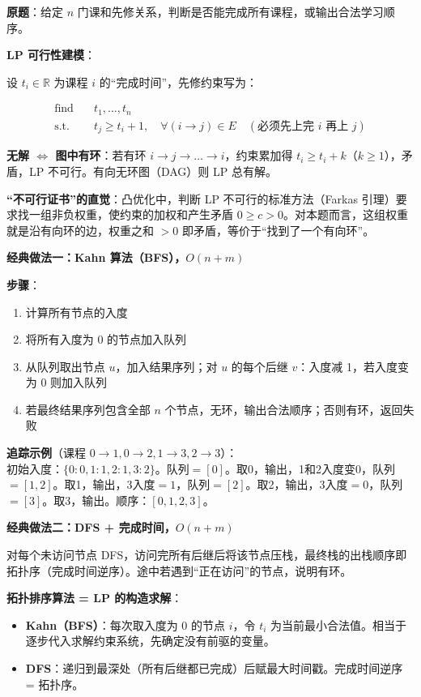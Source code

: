 \documentclass[12pt, a4paper]{ctexart}
\begin{document}
\begin{blackboard}

\textbf{原题}：给定 $n$ 门课和先修关系，判断是否能完成所有课程，或输出合法学习顺序。

\textbf{LP 可行性建模}：

设 $t_i \in \mathbb{R}$ 为课程 $i$ 的``完成时间''，先修约束写为：

\begin{align}
\text{find} \quad & t_1, \ldots, t_n \\
\text{s.t.} \quad & t_j \geq t_i + 1, \quad \forall (i \to j) \in E \quad (\text{必须先上完 }i\text{ 再上 }j)
\end{align}

\textbf{无解 $\Leftrightarrow$ 图中有环}：若有环 $i \to j \to \ldots \to i$，约束累加得 $t_i \geq t_i + k$（$k \geq 1$），矛盾，LP 不可行。有向无环图（DAG）则 LP 总有解。

\textbf{``不可行证书''的直觉}：凸优化中，判断 LP 不可行的标准方法（Farkas 引理）要求找一组非负权重，使约束的加权和产生矛盾 $0 \geq c > 0$。对本题而言，这组权重就是沿有向环的边，权重之和 $> 0$ 即矛盾，等价于``找到了一个有向环''。

\textbf{经典做法一：Kahn 算法（BFS），$O(n+m)$}

\textbf{步骤}：
\begin{enumerate}
    \item 计算所有节点的入度
    \item 将所有入度为 0 的节点加入队列
    \item 从队列取出节点 $u$，加入结果序列；对 $u$ 的每个后继 $v$：入度减 1，若入度变为 0 则加入队列
    \item 若最终结果序列包含全部 $n$ 个节点，无环，输出合法顺序；否则有环，返回失败
\end{enumerate}

\textbf{追踪示例}（课程 $0\to 1, 0\to 2, 1\to 3, 2\to 3$）：\\
初始入度：$\{0:0,1:1,2:1,3:2\}$。队列$=[0]$。取0，输出，1和2入度变0，队列$=[1,2]$。取1，输出，3入度$=1$，队列$=[2]$。取2，输出，3入度$=0$，队列$=[3]$。取3，输出。顺序：$[0,1,2,3]$。

\textbf{经典做法二：DFS + 完成时间，$O(n+m)$}

对每个未访问节点 DFS，访问完所有后继后将该节点压栈，最终栈的出栈顺序即拓扑序（完成时间逆序）。途中若遇到``正在访问''的节点，说明有环。

\textbf{拓扑排序算法 = LP 的构造求解}：

\begin{itemize}
    \item \textbf{Kahn（BFS）}：每次取入度为 0 的节点 $i$，令 $t_i$ 为当前最小合法值。相当于逐步代入求解约束系统，先确定没有前驱的变量。
    \item \textbf{DFS}：递归到最深处（所有后继都已完成）后赋最大时间戳。完成时间逆序 = 拓扑序。
\end{itemize}


\end{blackboard}
\end{document}
